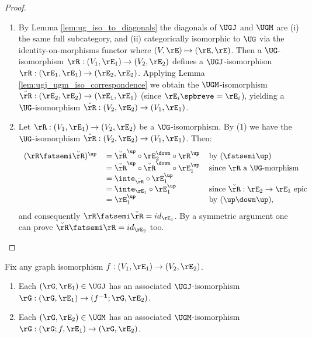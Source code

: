 \documentclass{article}
\begin{document}
\begin{proof}
\item
\begin{enumerate}
\item
By Lemma \ref{lem:ug_iso_to_diagonals} the diagonals of $\UGJ$ and $\UGM$ are (i) the same full subcategory, and (ii) categorically isomorphic to $\UG$ via the identity-on-morphisms functor where $(V,\rE) \mapsto (\rE,\rE)$. Then a $\UG$-isomorphism $\rR : (V_1,\rE_1) \to (V_2,\rE_2)$ defines a $\UGJ$-isomorphism $\rR : (\rE_1,\rE_1) \to (\rE_2,\rE_2)$. Applying Lemma \ref{lem:ugj_ugm_iso_correspondence} we obtain the $\UGM$-isomorphism $\breve{\rR} : (\rE_2,\rE_2) \to (\rE_1,\rE_1)$ (since $\rE_i\spbreve = \rE_i$), yielding a $\UG$-isomorphism $\breve{\rR} : (V_2,\rE_2) \to (V_1,\rE_1)$.

\item
Let $\rR : (V_1,\rE_1) \to (V_2,\rE_2)$ be a $\UG$-isomorphism. By (1) we have the $\UG$-isomorphism $\breve{\rR} : (V_2,\rE_2) \to (V_1,\rE_1)$. Then:
\[
\begin{tabular}{lll}
$(\rR \fatsemi \breve{\rR})^\up$
&
$= \breve{\rR}^\up \circ \rE_2^\down \circ \rR^\up$
& by $(\fatsemi\up)$
\\&
$= \breve{\rR}^\up \circ \breve{\rR}^\down \circ \rE_1^\up$
& since $\rR$ a $\UG$-morphism
\\&
$= \inte_{\breve{\rR}} \circ \rE_1^\up$
\\&
$= \inte_{\rE_1} \circ \rE_1^\up$
& since $\breve{\rR} : \rE_2 \to \rE_1$ epic
\\&
$= \rE_1^\up$
& by $(\up\down\up)$,
\end{tabular}
\]
and consequently $\rR \fatsemi \breve{\rR} = id_{\rE_1}$. By a symmetric argument one can prove $\breve{\rR} \fatsemi \rR = id_{\rE_2}$ too.

\end{enumerate}
\end{proof}

\smallskip


\begin{lemma}
\item
Fix any graph isomorphism $f : (V_1,\rE_1) \to (V_2,\rE_2)$.
\begin{enumerate}
\item
Each $(\rG,\rE_1) \in \UGJ$ has an associated $\UGJ$-isomorphism $\rG : (\rG,\rE_1) \to (f^{\bf-1} ; \rG, \rE_2)$.
\item
Each $(\rG,\rE_2) \in \UGM$ has an associated $\UGM$-isomorphism $\rG : (\rG ; f,\rE_1) \to (\rG , \rE_2)$.
\end{enumerate}
\end{lemma}
\end{document}
